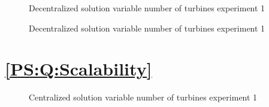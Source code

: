 \begin{figure}[h]
	\centering
	
	\caption{Decentralized solution variable number of turbines experiment 1}
	\label{fig:exp:decen:turbines}
\end{figure}

\begin{figure}[h]
	\centering
	
	\caption{Decentralized solution variable number of turbines experiment 1}
	\label{fig:exp:decen:turbines_cache}
\end{figure}

\section{\ref{PS:Q:Scalability}}

\begin{figure}[h]
	\centering
	
	\caption{Centralized solution variable number of turbines experiment 1}
	\label{fig:exp:cen:turbines}
\end{figure}
